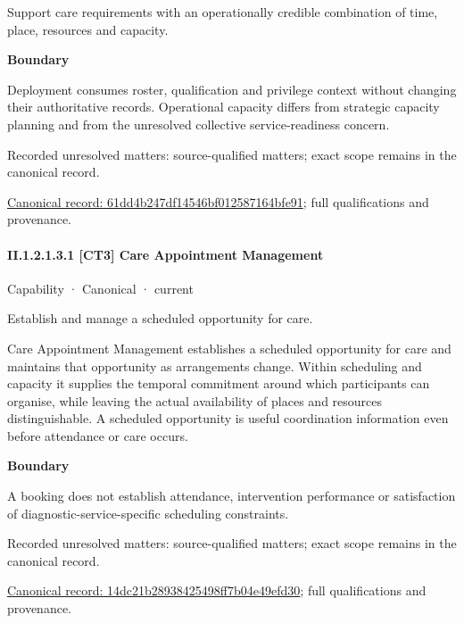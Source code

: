 Support care requirements with an operationally credible combination of time, place, resources and capacity.



\textbf{Boundary}



Deployment consumes roster, qualification and privilege context without changing their authoritative records. Operational capacity differs from strategic capacity planning and from the unresolved collective service-readiness concern.


{\small Recorded unresolved matters: source-qualified matters; exact scope remains in the canonical record.}\par
{\footnotesize \href{../../../../../../../continuum/strategy/capability/61dd4b247df14546bf012587164bfe91.md}{Canonical record: 61dd4b247df14546bf012587164bfe91}; full qualifications and provenance.}\par
\paragraph*{II.1.2.1.3.1 [CT3] Care Appointment Management}
\label{navigation:II.1.2.1.3.1}

\label{element:14dc21b28938425498ff7b04e49efd30}
{\small Capability · Canonical · current}\par

Establish and manage a scheduled opportunity for care.



Care Appointment Management establishes a scheduled opportunity for care and maintains that opportunity as arrangements change. Within scheduling and capacity it supplies the temporal commitment around which participants can organise, while leaving the actual availability of places and resources distinguishable. A scheduled opportunity is useful coordination information even before attendance or care occurs.



\textbf{Boundary}



A booking does not establish attendance, intervention performance or satisfaction of diagnostic-service-specific scheduling constraints.


{\small Recorded unresolved matters: source-qualified matters; exact scope remains in the canonical record.}\par
{\footnotesize \href{../../../../../../../continuum/strategy/capability/14dc21b28938425498ff7b04e49efd30.md}{Canonical record: 14dc21b28938425498ff7b04e49efd30}; full qualifications and provenance.}\par
